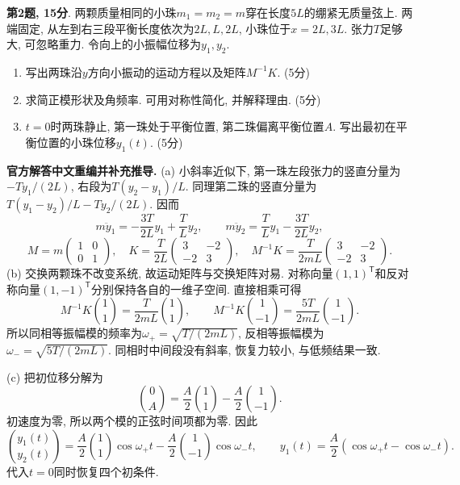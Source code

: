 \begin{exercise}
\textbf{第2题, 15分}. \label{exam:f2.2}
两颗质量相同的小珠$m_1=m_2=m$穿在长度$5L$的绷紧无质量弦上. 两端固定, 从左到右三段平衡长度依次为$2L,L,2L$, 小珠位于$x=2L,3L$. 张力$T$足够大, 可忽略重力. 令向上的小振幅位移为$y_1,y_2$.
\begin{enumerate}[label=(\alph*)]
\item 写出两珠沿$y$方向小振动的运动方程以及矩阵$M^{-1}K$. (5分)
\item 求简正模形状及角频率. 可用对称性简化, 并解释理由. (5分)
\item $t=0$时两珠静止, 第一珠处于平衡位置, 第二珠偏离平衡位置$A$. 写出最初在平衡位置的小珠位移$y_1(t)$. (5分)
\end{enumerate}
\end{exercise}
\begin{solution}
\textbf{官方解答中文重编并补充推导.}
(a) 小斜率近似下, 第一珠左段张力的竖直分量为$-Ty_1/(2L)$, 右段为$T(y_2-y_1)/L$. 同理第二珠的竖直分量为$T(y_1-y_2)/L-Ty_2/(2L)$. 因而
\[
m\ddot y_1=-\frac{3T}{2L}y_1+\frac TL y_2,\qquad
m\ddot y_2=\frac TL y_1-\frac{3T}{2L}y_2,
\]
\[
M=m\begin{pmatrix}1&0\\0&1\end{pmatrix},\quad
K=\frac T{2L}\begin{pmatrix}3&-2\\-2&3\end{pmatrix},\quad
M^{-1}K=\frac T{2mL}\begin{pmatrix}3&-2\\-2&3\end{pmatrix}.
\]
(b) 交换两颗珠不改变系统, 故运动矩阵与交换矩阵对易. 对称向量$(1,1)^{\mathsf T}$和反对称向量$(1,-1)^{\mathsf T}$分别保持各自的一维子空间. 直接相乘可得
\[
M^{-1}K\binom11=\frac T{2mL}\binom11,\qquad
M^{-1}K\binom1{-1}=\frac{5T}{2mL}\binom1{-1}.
\]
所以同相等振幅模的频率为$\omega_+=\sqrt{T/(2mL)}$, 反相等振幅模为$\omega_-=\sqrt{5T/(2mL)}$. 同相时中间段没有斜率, 恢复力较小, 与低频结果一致.

(c) 把初位移分解为
\[
\binom0A=\frac A2\binom11-\frac A2\binom1{-1}.
\]
初速度为零, 所以两个模的正弦时间项都为零. 因此
\[
\binom{y_1(t)}{y_2(t)}=
\frac A2\binom11\cos\omega_+t-\frac A2\binom1{-1}\cos\omega_-t,
\qquad y_1(t)=\frac A2(\cos\omega_+t-\cos\omega_-t).
\]
代入$t=0$同时恢复四个初条件.
\end{solution}

